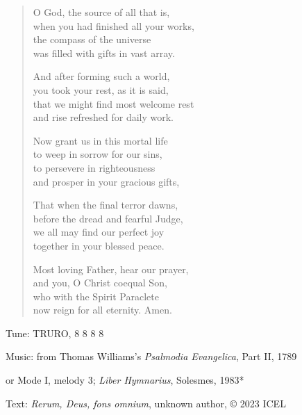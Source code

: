 \hymn

\begin{verse}
O God, the source of all that is,\\
when you had finished all your works,\\
the compass of the universe\\
was filled with gifts in vast array.

And after forming such a world,\\
you took your rest, as it is said,\\
that we might find most welcome rest\\
and rise refreshed for daily work.

Now grant us in this mortal life\\
to weep in sorrow for our sins,\\
to persevere in righteousness\\
and prosper in your gracious gifts,

That when the final terror dawns,\\
before the dread and fearful Judge,\\
we all may find our perfect joy\\
together in your blessed peace.

Most loving Father, hear our prayer,\\
and you, O Christ coequal Son,\\
who with the Spirit Paraclete\\
now reign for all eternity. Amen.
\end{verse}

\begin{hymnsource}
Tune: TRURO, 8 8 8 8

Music: from Thomas Williams’s \emph{Psalmodia Evangelica}, Part II, 1789

or Mode I, melody 3; \emph{Liber Hymnarius}, Solesmes, 1983*

Text: \emph{Rerum, Deus, fons omnium}, unknown author, © 2023 ICEL
\end{hymnsource}